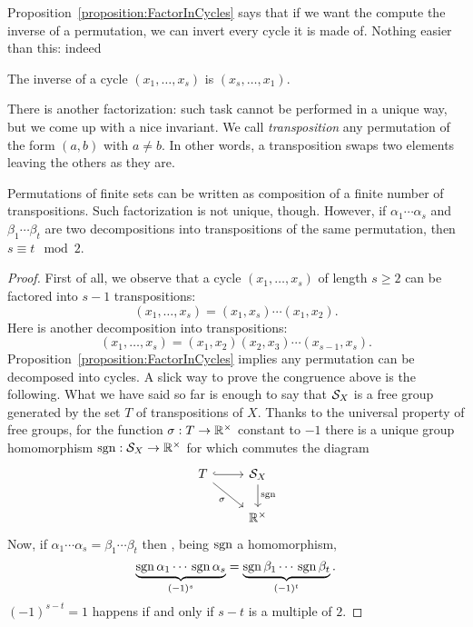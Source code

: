 Proposition~\ref{proposition:FactorInCycles} says that if we want the compute the inverse of a permutation, we can invert every cycle it is made of. Nothing easier than this: indeed

\begin{proposition}
The inverse of a cycle \((x_1,\dots{}, x_s)\) is \((x_s, \dots{}, x_1)\).
\end{proposition}

There is another factorization: such task cannot be performed in a unique way, but we come up with a nice invariant. We call {\em transposition} any permutation of the form \((a, b)\) with \(a \ne b\). In other words, a transposition swaps two elements leaving the others as they are.


\begin{proposition}
Permutations of finite sets can be written as composition of a finite number of transpositions. Such factorization is not unique, though. However, if \(\alpha_1 \cdots{} \alpha_s \) and \(\beta_1 \cdots{} \beta_t\) are two decompositions into transpositions of the same permutation, then \(s \equiv t \mod 2\).
\end{proposition}

\begin{proof}
First of all, we observe that a cycle \((x_1, \dots{}, x_s)\) of length \(s \ge 2\) can be factored into \(s-1\) transpositions:
\[(x_1, \dots{}, x_s) = (x_1, x_s) \cdots (x_1, x_2) .\]
Here is another decomposition into  transpositions:
\[(x_1, \dots{}, x_s) = (x_1, x_2)(x_2, x_3) \cdots (x_{s-1}, x_s) .\]
Proposition~\ref{proposition:FactorInCycles} implies any permutation can be decomposed into cycles. %
 A slick way to prove the congruence above is the following. What we have said so far is enough to say that \(\mathcal S_X\) is a free group generated by the set \(T\) of transpositions of \(X\). Thanks to the universal property of free groups, for the function \(\sigma : T \to \mathbb R^\times\) constant to \(-1\) there is a unique group homomorphism \(\operatorname{sgn} : \mathcal S_X \to \mathbb R^\times\) for which commutes the diagram
\[\begin{tikzcd}
T \ar[r, hookrightarrow] \ar["\sigma", dr, swap] & \cals_X \ar["\sgn", d] \\
& \rr^\times
\end{tikzcd}\]
Now, if \(\alpha_1 \cdots{} \alpha_s = \beta_1 \cdots{} \beta_t\) then
, being \(\operatorname{sgn}\) a homomorphism,
\[\underbrace{\operatorname{sgn}\alpha_1 \cdots{} \operatorname{sgn}\alpha_s}_{(-1)^s} = \underbrace{\operatorname{sgn}\beta_1 \cdots{} \operatorname{sgn}\beta_t}_{(-1)^t} .\]
\((-1)^{s-t} = 1\) happens if and only if \(s-t\) is a multiple of \(2\).
\end{proof}

